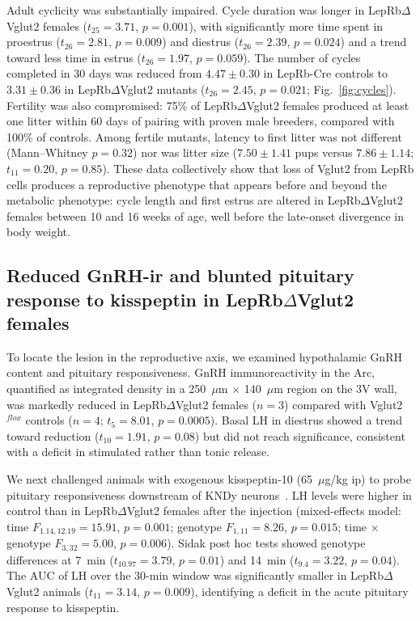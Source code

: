 \documentclass[11pt]{article}
\begin{document}
Adult cyclicity was substantially impaired. Cycle duration was longer in LepRb$\Delta$Vglut2 females ($t_{25}=3.71$, $p=0.001$), with significantly more time spent in proestrus ($t_{26}=2.81$, $p=0.009$) and diestrus ($t_{26}=2.39$, $p=0.024$) and a trend toward less time in estrus ($t_{26}=1.97$, $p=0.059$). The number of cycles completed in 30 days was reduced from $4.47\pm0.30$ in LepRb-Cre controls to $3.31\pm0.36$ in LepRb$\Delta$Vglut2 mutants ($t_{26}=2.45$, $p=0.021$; Fig.~\ref{fig:cycles}). Fertility was also compromised: 75\% of LepRb$\Delta$Vglut2 females produced at least one litter within 60 days of pairing with proven male breeders, compared with 100\% of controls. Among fertile mutants, latency to first litter was not different (Mann--Whitney $p=0.32$) nor was litter size ($7.50\pm1.41$ pups versus $7.86\pm1.14$; $t_{11}=0.20$, $p=0.85$). These data collectively show that loss of Vglut2 from LepRb cells produces a reproductive phenotype that appears before and beyond the metabolic phenotype: cycle length and first estrus are altered in LepRb$\Delta$Vglut2 females between 10 and 16 weeks of age, well before the late-onset divergence in body weight.

\subsection{Reduced GnRH-ir and blunted pituitary response to kisspeptin in LepRb$\Delta$Vglut2 females}
To locate the lesion in the reproductive axis, we examined hypothalamic GnRH content and pituitary responsiveness. GnRH immunoreactivity in the Arc, quantified as integrated density in a 250~$\mu$m $\times$ 140~$\mu$m region on the 3V wall, was markedly reduced in LepRb$\Delta$Vglut2 females ($n=3$) compared with Vglut2$^{flox}$ controls ($n=4$; $t_{5}=8.01$, $p=0.0005$). Basal LH in diestrus showed a trend toward reduction ($t_{10}=1.91$, $p=0.08$) but did not reach significance, consistent with a deficit in stimulated rather than tonic release.

We next challenged animals with exogenous kisspeptin-10 (65~$\mu$g/kg ip) to probe pituitary responsiveness downstream of KNDy neurons~\citep{gottsch2004role}. LH levels were higher in control than in LepRb$\Delta$Vglut2 females after the injection (mixed-effects model: time $F_{1.14,12.19}=15.91$, $p=0.001$; genotype $F_{1,11}=8.26$, $p=0.015$; time $\times$ genotype $F_{3,32}=5.00$, $p=0.006$). Sidak post hoc tests showed genotype differences at 7~min ($t_{10.97}=3.79$, $p=0.01$) and 14~min ($t_{9.4}=3.22$, $p=0.04$). The AUC of LH over the 30-min window was significantly smaller in LepRb$\Delta$Vglut2 animals ($t_{11}=3.14$, $p=0.009$), identifying a deficit in the acute pituitary response to kisspeptin.
\end{document}

